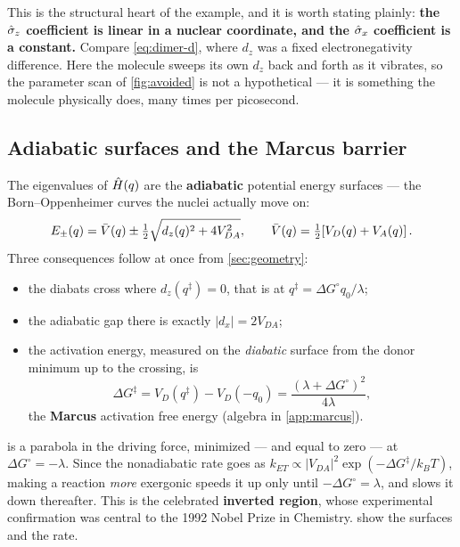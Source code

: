 \noindent
This is the structural heart of the example, and it is worth stating plainly:
\textbf{the $\hat{\sigma}_z$ coefficient is linear in a nuclear coordinate, and the $\hat{\sigma}_x$
coefficient is a constant.} Compare \cref{eq:dimer-d}, where $d_z$ was a fixed
electronegativity difference. Here the molecule sweeps its own $d_z$ back and forth as
it vibrates, so the parameter scan of \cref{fig:avoided} is not a hypothetical --- it is
something the molecule physically does, many times per picosecond.

\subsection{Adiabatic surfaces and the Marcus barrier}

The eigenvalues of $\hat{H}(q)$ are the \textbf{adiabatic} potential energy surfaces --- the
Born--Oppenheimer curves the nuclei actually move on:
%
\begin{equation}
E_\pm(q) = \bar{V}(q) \pm \tfrac{1}{2}\sqrt{d_z(q)^2 + 4V_{DA}^2},
\qquad \bar{V}(q) = \tfrac{1}{2}\!\left[V_D(q)+V_A(q)\right].
\label{eq:adiabats}
\end{equation}
%
Three consequences follow at once from \cref{sec:geometry}:

\begin{itemize}[leftmargin=*,itemsep=2pt]
\item the diabats cross where $d_z(q^\ddagger)=0$, that is at
      $q^\ddagger = \Delta G^\circ q_0/\lambda$;
\item the adiabatic gap there is exactly $|d_x| = 2V_{DA}$;
\item the activation energy, measured on the \emph{diabatic} surface from the donor
      minimum up to the crossing, is
      \begin{equation}
      \Delta G^{\ddagger} = V_D(q^\ddagger) - V_D(-q_0)
          = \frac{(\lambda+\Delta G^\circ)^2}{4\lambda},
      \label{eq:marcus-barrier}
      \end{equation}
      the \textbf{Marcus} activation free energy \cite{Marcus1956,MarcusNobel}
      (algebra in \cref{app:marcus}).
\end{itemize}

 is a parabola in the driving force, minimized --- and equal to
zero --- at $\Delta G^\circ = -\lambda$. Since the nonadiabatic rate goes as
$k_{ET}\propto |V_{DA}|^2\exp(-\Delta G^\ddagger/k_BT)$, making a reaction \emph{more}
exergonic speeds it up only until $-\Delta G^\circ = \lambda$, and slows it down
thereafter. This is the celebrated \textbf{inverted region}, whose experimental
confirmation was central to the 1992 Nobel Prize in Chemistry. 
show the surfaces and the rate.

